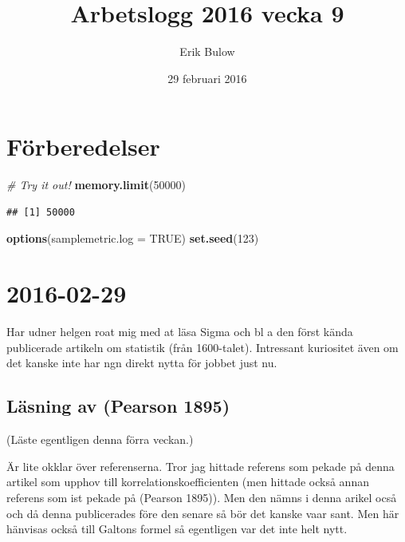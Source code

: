 \documentclass[]{article}
\title{Arbetslogg 2016 vecka 9}
\author{Erik Bulow}
\date{29 februari 2016}
\newenvironment{Shaded}{\begin{snugshade}}{\end{snugshade}}
\newcommand{\KeywordTok}[1]{\textcolor[rgb]{0.13,0.29,0.53}{\textbf{{#1}}}}
\newcommand{\DataTypeTok}[1]{\textcolor[rgb]{0.13,0.29,0.53}{{#1}}}
\newcommand{\DecValTok}[1]{\textcolor[rgb]{0.00,0.00,0.81}{{#1}}}
\newcommand{\CommentTok}[1]{\textcolor[rgb]{0.56,0.35,0.01}{\textit{{#1}}}}
\newcommand{\OtherTok}[1]{\textcolor[rgb]{0.56,0.35,0.01}{{#1}}}
\newcommand{\NormalTok}[1]{{#1}}
\begin{document}
\maketitle

{
\hypersetup{linkcolor=black}
\setcounter{tocdepth}{2}
\tableofcontents
}
\section{Förberedelser}\label{forberedelser}

\begin{Shaded}
\begin{Highlighting}[]
\CommentTok{# Try it out!}
\KeywordTok{memory.limit}\NormalTok{(}\DecValTok{50000}\NormalTok{)}
\end{Highlighting}
\end{Shaded}

\begin{verbatim}
## [1] 50000
\end{verbatim}

\begin{Shaded}
\begin{Highlighting}[]
\KeywordTok{options}\NormalTok{(}\DataTypeTok{samplemetric.log =} \OtherTok{TRUE}\NormalTok{)}
\KeywordTok{set.seed}\NormalTok{(}\DecValTok{123}\NormalTok{)}
\end{Highlighting}
\end{Shaded}

\section{2016-02-29}\label{section}

Har udner helgen roat mig med at läsa Sigma och bl a den först kända
publicerade artikeln om statistik (från 1600-talet). Intressant
kuriositet även om det kanske inte har ngn direkt nytta för jobbet just
nu.

\subsection{Läsning av (Pearson 1895)}\label{lasning-av-pearson1895}

(Läste egentligen denna förra veckan.)

Är lite okklar över referenserna. Tror jag hittade referens som pekade
på denna artikel som upphov till korrelationskoefficienten (men hittade
också annan referens som ist pekade på (Pearson 1895)). Men den nämns i
denna arikel ocså och då denna publicerades före den senare så bör det
kanske vaar sant. Men här hänvisas också till Galtons formel så
egentligen var det inte helt nytt.
\end{document}

